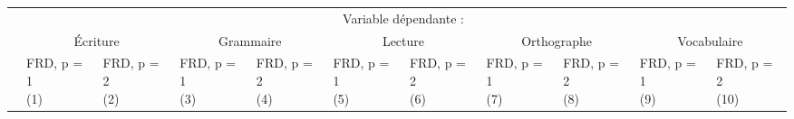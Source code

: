 \documentclass[
]{book}
\begin{document}
\begin{ThreePartTable}
\begin{longtable}[t]{lllllllllll}
\toprule
\multicolumn{1}{c}{} & \multicolumn{10}{c}{Variable dépendante : } \\
\cmidrule(l{3pt}r{3pt}){2-11}
\multicolumn{1}{c}{} & \multicolumn{2}{c}{Écriture} & \multicolumn{2}{c}{Grammaire} & \multicolumn{2}{c}{Lecture} & \multicolumn{2}{c}{Orthographe} & \multicolumn{2}{c}{Vocabulaire} \\
\cmidrule(l{3pt}r{3pt}){2-3} \cmidrule(l{3pt}r{3pt}){4-5} \cmidrule(l{3pt}r{3pt}){6-7} \cmidrule(l{3pt}r{3pt}){8-9} \cmidrule(l{3pt}r{3pt}){10-11}
 & \makecell{FRD, p = 1 \\ (1) } & \makecell{FRD, p = 2 \\ (2) } & \makecell{FRD, p = 1 \\ (3) } & \makecell{FRD, p = 2 \\ (4) } & \makecell{FRD, p = 1 \\ (5) } & \makecell{FRD, p = 2 \\ (6) } & \makecell{FRD, p = 1 \\ (7) } & \makecell{FRD, p = 2 \\ (8) } & \makecell{FRD, p = 1 \\ (9) } & \makecell{FRD, p = 2 \\ (10) }\\
\midrule
\endhead


\end{longtable}
\end{ThreePartTable}
\end{document}
